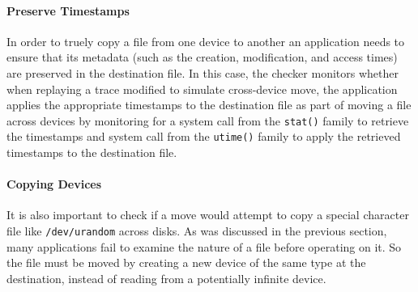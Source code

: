 \paragraph{Preserve Timestamps}

In order to truely copy a file from one device
to another an application needs to ensure that its metadata (such as the 
creation, modification, and access times) are preserved in the destination 
file.  
In this case, the checker monitors
whether when replaying a trace modified to simulate cross-device move,
the application applies
the appropriate timestamps to the destination file as part of moving a file
across devices by monitoring for a system call from the {\tt stat()} family to
retrieve the timestamps and system call from the {\tt utime()} family to apply
the retrieved timestamps to the destination file.

\paragraph{Copying Devices}

It is also important to check if a move would attempt to copy a
special character file like {\tt /dev/urandom} across disks.  As was discussed
in the previous section, many applications fail to examine the nature of a file
before operating on it.  So the file must be moved by creating a new device
of the same type at the destination, instead of reading from a potentially 
infinite device.


